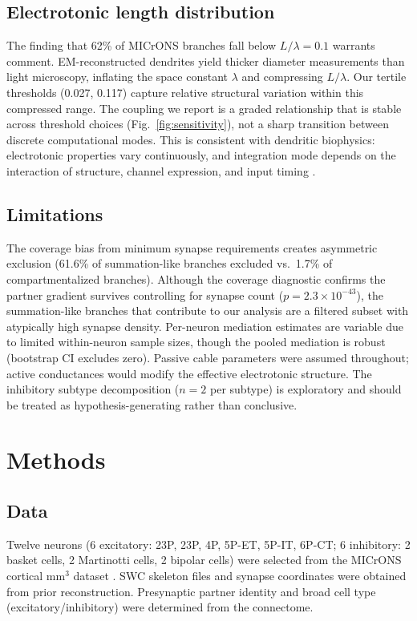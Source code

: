 \documentclass[11pt]{article}
\begin{document}
\subsection{Electrotonic length distribution}
\label{sec:electrotonic}

The finding that 62\% of MICrONS branches fall below $L/\lambda = 0.1$ warrants comment. EM-reconstructed dendrites yield thicker diameter measurements than light microscopy, inflating the space constant $\lambda$ and compressing $L/\lambda$. Our tertile thresholds (0.027, 0.117) capture relative structural variation within this compressed range. The coupling we report is a graded relationship that is stable across threshold choices (Fig.~\ref{fig:sensitivity}), not a sharp transition between discrete computational modes. This is consistent with dendritic biophysics: electrotonic properties vary continuously, and integration mode depends on the interaction of structure, channel expression, and input timing \citep{stuart1997}.

\subsection{Limitations}

The coverage bias from minimum synapse requirements creates asymmetric exclusion (61.6\% of summation-like branches excluded vs.\ 1.7\% of compartmentalized branches). Although the coverage diagnostic confirms the partner gradient survives controlling for synapse count ($p = 2.3 \times 10^{-43}$), the summation-like branches that contribute to our analysis are a filtered subset with atypically high synapse density. Per-neuron mediation estimates are variable due to limited within-neuron sample sizes, though the pooled mediation is robust (bootstrap CI excludes zero). Passive cable parameters were assumed throughout; active conductances would modify the effective electrotonic structure. The inhibitory subtype decomposition ($n = 2$ per subtype) is exploratory and should be treated as hypothesis-generating rather than conclusive.

\section{Methods}

\subsection{Data}

Twelve neurons (6 excitatory: 23P, 23P, 4P, 5P-ET, 5P-IT, 6P-CT; 6 inhibitory: 2 basket cells, 2 Martinotti cells, 2 bipolar cells) were selected from the MICrONS cortical mm$^3$ dataset \citep{microns2021}. SWC skeleton files and synapse coordinates were obtained from prior reconstruction. Presynaptic partner identity and broad cell type (excitatory/inhibitory) were determined from the connectome.
\end{document}

